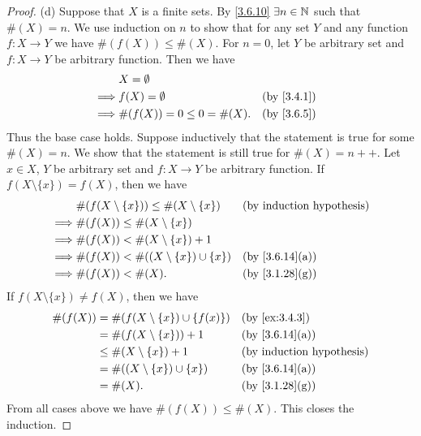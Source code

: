 \begin{proof}{(d)}
  Suppose that \(X\) is a finite sets.
  By \cref{3.6.10} \(\exists n \in \mathbb{N}\) such that \(\#(X) = n\).
  We use induction on \(n\) to show that for any set \(Y\) and any function \(f : X \to Y\) we have \(\#(f(X)) \leq \#(X)\).
  For \(n = 0\), let \(Y\) be arbitrary set and \(f : X \to Y\) be arbitrary function.
  Then we have
  \begin{align*}
             & X = \emptyset                                \\
    \implies & f(X) = \emptyset             &  & \by{3.4.1} \\
    \implies & \#(f(X)) = 0 \leq 0 = \#(X). &  & \by{3.6.5}
  \end{align*}
  Thus the base case holds.
  Suppose inductively that the statement is true for some \(\#(X) = n\).
  We show that the statement is still true for \(\#(X) = n++\).
  Let \(x \in X\), \(Y\) be arbitrary set and \(f : X \to Y\) be arbitrary function.
  If \(f(X \setminus \{x\}) = f(X)\), then we have
  \begin{align*}
             & \#(f(X \setminus \{x\})) \leq \#(X \setminus \{x\}) &  & \byIH                        \\
    \implies & \#(f(X)) \leq \#(X \setminus \{x\})                                                   \\
    \implies & \#(f(X)) < \#(X \setminus \{x\}) + 1                                                  \\
    \implies & \#(f(X)) < \#((X \setminus \{x\}) \cup \{x\})       &  & \text{(by \cref{3.6.14}(a))} \\
    \implies & \#(f(X)) < \#(X).                                   &  & \text{(by \cref{3.1.28}(g))}
  \end{align*}
  If \(f(X \setminus \{x\}) \neq f(X)\), then we have
  \begin{align*}
    \#(f(X)) & = \#(f(X \setminus \{x\}) \cup \{f(x)\}) &  & \by{ex:3.4.3}                \\
             & = \#(f(X \setminus \{x\})) + 1           &  & \text{(by \cref{3.6.14}(a))} \\
             & \leq \#(X \setminus \{x\}) + 1           &  & \byIH                        \\
             & = \#((X \setminus \{x\}) \cup \{x\})     &  & \text{(by \cref{3.6.14}(a))} \\
             & = \#(X).                                 &  & \text{(by \cref{3.1.28}(g))}
  \end{align*}
  From all cases above we have \(\#(f(X)) \leq \#(X)\).
  This closes the induction.


\end{proof}
